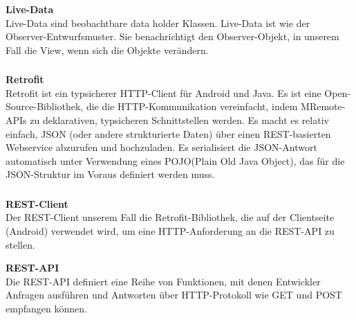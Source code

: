 \subsubsection{} 
\textbf{Live-Data}\\
Live-Data sind beobachtbare data holder Klassen. Live-Data ist wie der Observer-Entwurfsmuster. Sie benachrichtigt den Observer-Objekt, in unserem Fall die View, wenn sich die Objekte verändern. 

\subsubsection{} 
\textbf{Retrofit}\\
Retrofit ist ein typsicherer HTTP-Client für Android und Java. Es ist eine Open-Source-Bibliothek, die die HTTP-Kommunikation vereinfacht, indem MRemote-APIs zu deklarativen, typsicheren Schnittstellen werden. Es macht es relativ einfach, JSON (oder andere strukturierte Daten) über einen REST-basierten Webservice abzurufen und hochzuladen. Es serialisiert die JSON-Antwort automatisch unter Verwendung eines POJO(Plain Old Java Object), das für die JSON-Struktur im Voraus definiert werden muss.


\subsubsection{} 
\textbf{REST-Client}\\
Der REST-Client unserem Fall die Retrofit-Bibliothek, die auf der Clientseite (Android) verwendet wird, um eine HTTP-Anforderung an die REST-API zu stellen.

\textbf{REST-API}\\
Die REST-API definiert eine Reihe von Funktionen, mit denen Entwickler Anfragen ausführen und Antworten über HTTP-Protokoll wie GET und POST empfangen können.
